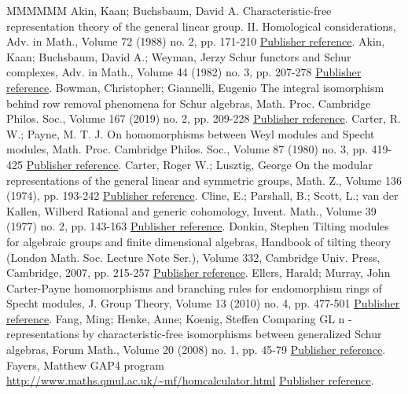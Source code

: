 \documentclass[11pt]{article}
\theoremstyle{definition}
\numberwithin{equation}{section}
\numberwithin{equation}{section}
\begin{document}
\begin{thebibliography}{MMMMMM}
 Akin, Kaan; Buchsbaum, David A. Characteristic-free representation theory of the general linear group. II. Homological considerations, Adv. in Math., Volume 72 (1988) no. 2, pp. 171-210 \href{https://alco.centre-mersenne.org/articles/10.5802/alco.397/#AB}{Publisher reference}.
 Akin, Kaan; Buchsbaum, David A.; Weyman, Jerzy Schur functors and Schur complexes, Adv. in Math., Volume 44 (1982) no. 3, pp. 207-278 \href{https://alco.centre-mersenne.org/articles/10.5802/alco.397/#ABW}{Publisher reference}.
 Bowman, Christopher; Giannelli, Eugenio The integral isomorphism behind row removal phenomena for Schur algebras, Math. Proc. Cambridge Philos. Soc., Volume 167 (2019) no. 2, pp. 209-228 \href{https://alco.centre-mersenne.org/articles/10.5802/alco.397/#BG}{Publisher reference}.
 Carter, R. W.; Payne, M. T. J. On homomorphisms between Weyl modules and Specht modules, Math. Proc. Cambridge Philos. Soc., Volume 87 (1980) no. 3, pp. 419-425 \href{https://alco.centre-mersenne.org/articles/10.5802/alco.397/#CP}{Publisher reference}.
 Carter, Roger W.; Lusztig, George On the modular representations of the general linear and symmetric groups, Math. Z., Volume 136 (1974), pp. 193-242 \href{https://alco.centre-mersenne.org/articles/10.5802/alco.397/#CL}{Publisher reference}.
 Cline, E.; Parshall, B.; Scott, L.; van der Kallen, Wilberd Rational and generic cohomology, Invent. Math., Volume 39 (1977) no. 2, pp. 143-163 \href{https://alco.centre-mersenne.org/articles/10.5802/alco.397/#CPSK}{Publisher reference}.
 Donkin, Stephen Tilting modules for algebraic groups and finite dimensional algebras, Handbook of tilting theory (London Math. Soc. Lecture Note Ser.), Volume 332, Cambridge Univ. Press, Cambridge, 2007, pp. 215-257 \href{https://alco.centre-mersenne.org/articles/10.5802/alco.397/#D}{Publisher reference}.
 Ellers, Harald; Murray, John Carter-Payne homomorphisms and branching rules for endomorphism rings of Specht modules, J. Group Theory, Volume 13 (2010) no. 4, pp. 477-501 \href{https://alco.centre-mersenne.org/articles/10.5802/alco.397/#EM}{Publisher reference}.
 Fang, Ming; Henke, Anne; Koenig, Steffen Comparing  GL  n -representations by characteristic-free isomorphisms between generalized Schur algebras, Forum Math., Volume 20 (2008) no. 1, pp. 45-79 \href{https://alco.centre-mersenne.org/articles/10.5802/alco.397/#FHKD}{Publisher reference}.
 Fayers, Matthew GAP4 program \url{http://www.maths.qmul.ac.uk/~mf/homcalculator.html} \href{https://alco.centre-mersenne.org/articles/10.5802/alco.397/#FGAP}{Publisher reference}.

\end{thebibliography}
\end{document}
